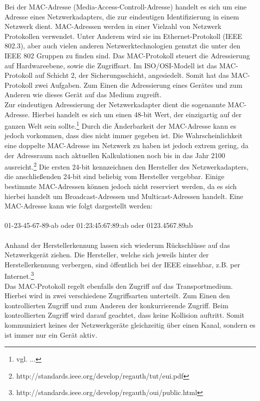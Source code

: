 Bei der MAC-Adresse (Media-Access-Controll-Adresse) handelt es sich um eine Adresse eines Netzwerkadapters, die zur eindeutigen Identifizierung in einem Netzwerk dient. MAC-Adressen werden in einer Vielzahl von Netzwerk Protokollen verwendet.
Unter Anderem wird sie im Ethernet-Protokoll (IEEE 802.3), aber auch vielen anderen Netzwerktechnologien genutzt die unter den IEEE 802 Gruppen zu finden sind.
Das MAC-Protokoll steuert die Adressierung auf Hardwareebene, sowie die Zugriffsart.
Im ISO/OSI-Modell ist das MAC-Protokoll auf Schicht 2, der Sicherungsschicht, angesiedelt.
Somit hat das MAC-Protokoll zwei Aufgaben. Zum Einen die Adressierung eines Gerätes und zum Anderen wie dieses Gerät auf das Medium zugreift.\\
Zur eindeutigen Adressierung der Netzwerkadapter  dient die sogenannte MAC-Adresse. Hierbei handelt es sich um einen 48-bit Wert, der einzigartig auf der ganzen Welt sein sollte.\footnote{vgl. ...} Durch die Änderbarkeit der MAC-Adresse kann es jedoch vorkommen, dass dies nicht immer gegeben ist. Die Wahrscheinlichkeit eine doppelte MAC-Adresse im Netzwerk zu haben ist jedoch extrem gering, da der Adressraum nach aktuellen Kalkulationen noch bis in das Jahr 2100 ausreicht.\footnote{http://standards.ieee.org/develop/regauth/tut/eui.pdf} Die ersten 24-bit kennzeichnen den Hersteller des Netzwerkadapters, die anschließenden 24-bit sind beliebig vom Hersteller vergebbar.
Einige bestimmte MAC-Adressen können jedoch nicht reserviert werden, da es sich hierbei handelt um Broadcast-Adressen und Multicast-Adressen handelt.
Eine MAC-Adresse kann wie folgt dargestellt werden:\\
\\
01-23-45-67-89-ab oder 01:23:45:67:89:ab oder 0123.4567.89ab\\
\\
Anhand der Herstellerkennung lassen sich wiederum Rückschlüsse auf das Netzwerkgerät ziehen.
Die Hersteller, welche sich jeweils hinter der Herstellerkennung verbergen, sind öffentlich bei der IEEE einsehbar, z.B. per Internet.\footnote{http://standards.ieee.org/develop/regauth/oui/public.html}\\
Das MAC-Protokoll regelt ebenfalls den Zugriff auf das Transportmedium. Hierbei wird in zwei verschiedene Zugriffsarten unterteilt. Zum Einen den kontrollierten Zugriff und zum Anderen der konkurrierende Zugriff.
Beim kontrollierten Zugriff wird darauf geachtet, dass keine Kollision auftritt. Somit kommuniziert keines der Netzwerkgeräte gleichzeitig über einen Kanal, sondern es ist immer nur ein Gerät aktiv.\\
